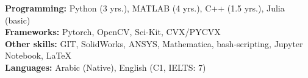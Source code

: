 \textbf{Programming:} Python (3 yrs.), MATLAB (4 yrs.), C++ (1.5 yrs.), Julia (basic)\\
\textbf{Frameworks:} Pytorch, OpenCV, Sci-Kit, CVX/PYCVX\\
\textbf{Other skills:} GIT, SolidWorks, ANSYS, Mathematica, bash-scripting, Jupyter Notebook, \LaTeX\\
\textbf{Languages:} Arabic (Native), English (C1, IELTS: 7)